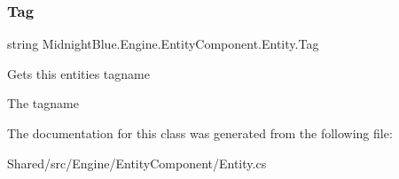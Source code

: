 \subsubsection{\texorpdfstring{Tag}{Tag}}
{\footnotesize\ttfamily string Midnight\+Blue.\+Engine.\+Entity\+Component.\+Entity.\+Tag\hspace{0.3cm}{\ttfamily [get]}}



Gets this entities tagname 

The tagname

The documentation for this class was generated from the following file\+:\begin{DoxyCompactItemize}
\item 
Shared/src/\+Engine/\+Entity\+Component/Entity.\+cs\end{DoxyCompactItemize}
